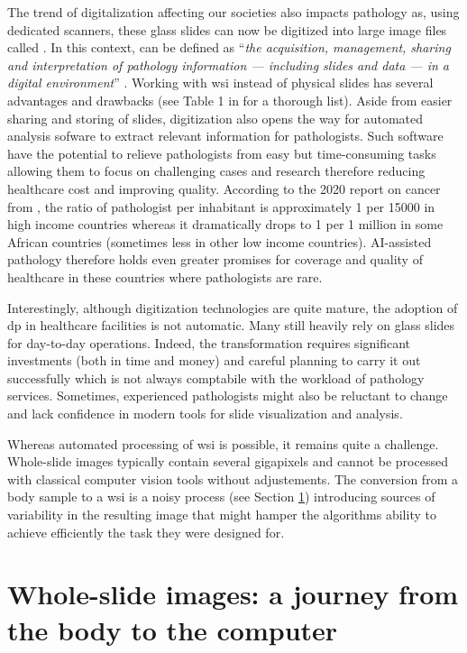 The trend of digitalization affecting our societies also impacts pathology as, using dedicated scanners, these glass slides can now be digitized into large image files called . In this context,  can be defined as ``\textit{the acquisition, management, sharing and interpretation of pathology information — including slides and data — in a digital environment}'' \parencite{doolan2019whatisdp}. Working with \acrshort{wsi} instead of physical slides has several advantages and drawbacks (see Table 1 in \parencite{jahn2020digital} for a thorough list). Aside from easier sharing and storing of slides, digitization also opens the way for automated analysis sofware to extract relevant information for pathologists. Such software have the potential to relieve pathologists from easy but time-consuming tasks allowing them to focus on challenging cases and research therefore reducing healthcare cost and improving quality. According to the 2020 report on cancer from  \parencite{world2020report}, the ratio of pathologist per inhabitant is approximately 1 per 15000 in high income countries whereas it dramatically drops to 1 per 1 million in some African countries (sometimes less in other low income countries). AI-assisted pathology therefore holds even greater promises for coverage and quality of healthcare in these countries where pathologists are rare.  

Interestingly, although digitization technologies are quite mature, the adoption of \acrlong{dp} in healthcare facilities is not automatic. Many still heavily rely on glass slides for day-to-day operations. Indeed, the transformation requires significant investments (both in time and money) and careful planning to carry it out successfully which is not always comptabile with the workload of pathology services. Sometimes, experienced pathologists might also be reluctant to change and lack confidence in modern tools for slide visualization and analysis. 

Whereas automated processing of \acrshort{wsi} is possible, it remains quite a challenge. Whole-slide images typically contain several gigapixels and cannot be processed with classical computer vision tools without adjustements. The conversion from a body sample to a \acrshort{wsi} is a noisy process (see Section \ref{sec:backdp:wsi}) introducing sources of variability in the resulting image that might hamper the algorithms ability to achieve efficiently the task they were designed for.

\section{Whole-slide images: a journey from the body to the computer}
\label{sec:backdp:wsi}

